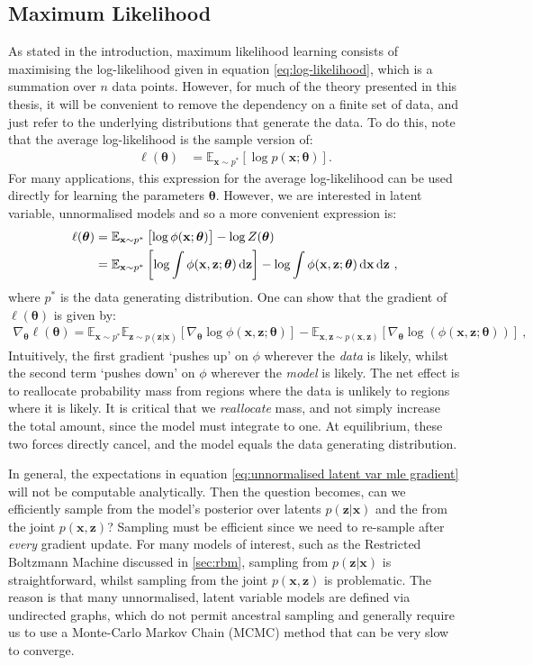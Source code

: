 \documentclass[11pt, oneside]{article}
\newcommand{\thetab}{{\boldsymbol{\theta}}}
\newcommand{\pnorm}{p}
\newcommand{\pnn}{\phi}
\newcommand{\gradtheta}{\nabla_{\thetab}}
\newcommand{\x}{{\mathbf x}}
\newcommand{\z}{{\mathbf z}}
\newcommand{\E}{\mathbb{E}}
\newcommand{\Edata}{\E_{\x \sim p^*}}
\theoremstyle{definition}
\begin{document}
\subsection{Maximum Likelihood}
\label{sec:mle}
As stated in the introduction, maximum likelihood learning consists of maximising the log-likelihood given in equation \ref{eq:log-likelihood}, which is a summation over $n$ data points. However, for much of the theory presented in this thesis, it will be convenient to remove the dependency on a finite set of data, and just refer to the underlying distributions that generate the data. To do this, note that the average log-likelihood is the sample version of:
\begin{align}
\label{eq:expectation log-like}
\ell(\thetab) &= \Edata \left[ \log \pnorm(\x;\thetab) \right].
\end{align}
For many applications, this expression for the average log-likelihood can be used directly for learning the parameters $\thetab$. However, we are interested in latent variable, unnormalised models and so a more convenient expression is:
\begin{align}
\ell(\thetab) &= \Edata \left[\log \pnn(\x;\thetab) \right] - \log Z(\thetab) \\
              &= \Edata \left[ \log \int\pnn(\x, \z;\thetab) \dif \z \right] - \log \int\pnn(\x, \z;\thetab) \dif \x \dif \z \ ,
\end{align}
where $p^*$ is the data generating distribution. One can show that the gradient of $\ell(\thetab)$ is given by:
\begin{align}
    \label{eq:unnormalised latent var mle gradient}
    \gradtheta \ell(\thetab) = \Edata \E_{\z \sim p(\z | \x)} \left[ \gradtheta \log \pnn(\x, \z;\thetab) \right] - \E_{\x, \z \sim p(\x, \z)} \left[\gradtheta \log \left(\pnn(\x, \z;\thetab) \right) \right] \ ,
\end{align}
Intuitively, the first gradient `pushes up' on $\pnn$ wherever the \emph{data} is likely, whilst the second term `pushes down' on  $\pnn$ wherever the \emph{model} is likely. The net effect is to reallocate probability mass from regions where the data is unlikely to regions where it is likely. It is critical that we \emph{reallocate} mass, and not simply increase the total amount, since the model must integrate to one. At equilibrium, these two forces directly cancel, and the model equals the data generating distribution.


In general, the expectations in equation \ref{eq:unnormalised latent var mle gradient} will not be computable analytically. Then the question becomes, can we efficiently sample from the model's posterior over latents $p(\z | \x)$ and the from the joint $p(\x, \z)$? Sampling must be efficient since we need to re-sample after \emph{every} gradient update. For many models of interest, such as the Restricted Boltzmann Machine discussed in \ref{sec:rbm}, sampling from $p(\z | \x)$ is straightforward, whilst sampling from the joint $p(\x, \z)$ is problematic. The reason is that many unnormalised, latent variable models are defined via undirected graphs, which do not permit ancestral sampling and generally require us to use a Monte-Carlo Markov Chain (MCMC) method that can be very slow to converge.
\end{document}
